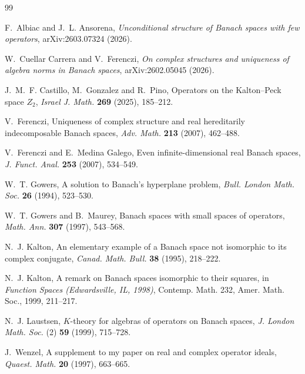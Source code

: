\documentclass[11pt]{article}
\theoremstyle{definition}
\theoremstyle{remark}
\begin{document}
\begin{thebibliography}{99}

F.~Albiac and J.~L. Ansorena,
\newblock \emph{Unconditional structure of Banach spaces with few operators},
\newblock arXiv:2603.07324 (2026).

W.~Cuellar Carrera and V.~Ferenczi,
\newblock \emph{On complex structures and uniqueness of algebra norms in Banach spaces},
\newblock arXiv:2602.05045 (2026).

J.~M.~F. Castillo, M.~Gonzalez and R.~Pino,
\newblock Operators on the Kalton--Peck space $Z_2$,
\newblock \emph{Israel J. Math.} \textbf{269} (2025), 185--212.

V.~Ferenczi,
\newblock Uniqueness of complex structure and real hereditarily indecomposable Banach spaces,
\newblock \emph{Adv. Math.} \textbf{213} (2007), 462--488.

V.~Ferenczi and E.~Medina Galego,
\newblock Even infinite-dimensional real Banach spaces,
\newblock \emph{J. Funct. Anal.} \textbf{253} (2007), 534--549.

W.~T. Gowers,
\newblock A solution to Banach's hyperplane problem,
\newblock \emph{Bull. London Math. Soc.} \textbf{26} (1994), 523--530.

W.~T. Gowers and B.~Maurey,
\newblock Banach spaces with small spaces of operators,
\newblock \emph{Math. Ann.} \textbf{307} (1997), 543--568.

N.~J. Kalton,
\newblock An elementary example of a Banach space not isomorphic to its complex conjugate,
\newblock \emph{Canad. Math. Bull.} \textbf{38} (1995), 218--222.

N.~J. Kalton,
\newblock A remark on Banach spaces isomorphic to their squares,
\newblock in \emph{Function Spaces (Edwardsville, IL, 1998)}, Contemp. Math. 232,
Amer. Math. Soc., 1999, 211--217.

N.~J. Laustsen,
\newblock $K$-theory for algebras of operators on Banach spaces,
\newblock \emph{J. London Math. Soc.} (2) \textbf{59} (1999), 715--728.

J.~Wenzel,
\newblock A supplement to my paper on real and complex operator ideals,
\newblock \emph{Quaest. Math.} \textbf{20} (1997), 663--665.

\end{thebibliography}
\end{document}
